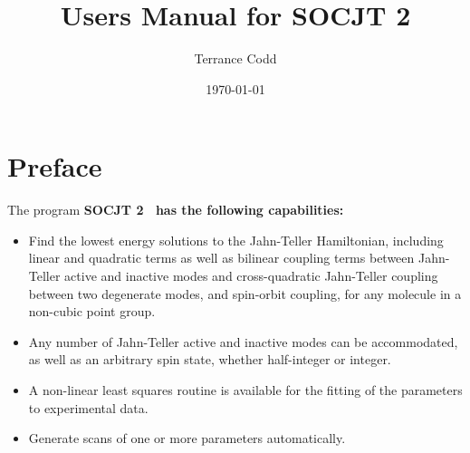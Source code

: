 \documentclass{article}
\newcommand{\socjttwo}{\bf{SOCJT 2 }}
\newenvironment{bulletlist}{%
  \renewcommand{\labelitemi}{$\bullet $}%
     \begin{itemize}}{\end{itemize}}
\begin{document}
\author{Terrance Codd}
\title{Users Manual for \socjttwo}

\date{\today}

\maketitle

\tableofcontents
\newpage

\setcounter{section}{-1}
\section{Preface} \label{section:preface}

The program \socjttwo\ has the following
capabilities: 
\begin{bulletlist}
\item Find the lowest energy solutions to the Jahn-Teller Hamiltonian, including linear and quadratic terms as well as bilinear coupling terms between Jahn-Teller active and inactive modes and cross-quadratic Jahn-Teller coupling between two degenerate modes, and spin-orbit coupling, for any molecule in a non-cubic point group.
\item Any number of Jahn-Teller active and inactive modes can be accommodated, as well as an arbitrary spin state, whether half-integer or integer.
\item A non-linear least squares routine is available for the fitting of the parameters to experimental data.
\item Generate scans of one or more parameters automatically.
\end{bulletlist}
\end{document}
